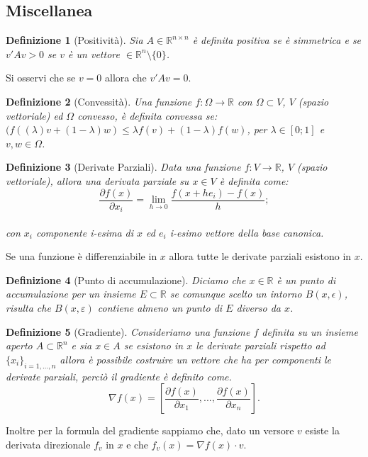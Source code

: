 \documentclass[a4paper, 12pt]{article}
\newtheorem{definition}{Definizione}
\begin{document}
\subsection{Miscellanea}
\begin{definition}[Positività]
Sia $A \in \mathbb{R}^{n \times n}$ è definita positiva se è simmetrica e se $v'Av > 0$ se $v$ è un vettore $\in \mathbb{R}^n \setminus \{0\}$.
\end{definition}
Si osservi che se $v = 0$ allora che $v'Av = 0$.
\begin{definition}[Convessità]
Una funzione $f:\Omega \to \mathbb{R}$ con $\Omega \subset V$, $V$ (spazio vettoriale) ed $\Omega$ convesso, è definita convessa se: $(f((\lambda)v + (1 - \lambda)w) \leq \lambda f(v) + (1 - \lambda)f(w)$, per $\lambda \in [0;1]$ e $v, w \in \Omega$.
\end{definition}
\begin{definition}[Derivate Parziali]
Data una funzione $f:V \to \mathbb{R}$, $V$ (spazio vettoriale), allora una derivata parziale su $x \in V$ è definita come:\\
\[\frac{\partial f(x)}{\partial x_i} = \lim_{h \to 0} \frac{f(x + h e_i) - f(x)}{h};\]\\ 
con $x_i$ componente i-esima di $x$ ed $e_i$ i-esimo vettore della base canonica.\\
\end{definition}
Se una funzione è differenziabile in $x$ allora tutte le derivate parziali esistono in $x$.
\begin{definition}[Punto di accumulazione]
Diciamo che $x \in \mathbb{R}$ è un punto di accumulazione per un insieme $E \subset \mathbb{R}$ se comunque scelto un intorno $B(x, \epsilon)$, risulta che $B(x, \varepsilon)$ contiene almeno un punto di $E$ diverso da $x$.
\end{definition}
\begin{definition}[Gradiente]
Consideriamo una funzione $f$ definita su un insieme aperto $A \subset \mathbb{R}^n$ e sia $x \in A$ se esistono in $x$ le derivate parziali rispetto ad $\{x_i\}_{i=1, ..., n}$ allora è possibile costruire un vettore che ha per componenti le derivate parziali, perciò il gradiente è definito come.\\
\[\nabla f(x) = \left[\frac{\partial f(x)}{\partial x_1}, ..., \frac{\partial f(x)}{\partial x_n}\right].\]
\end{definition}
Inoltre per la formula del gradiente sappiamo che, dato un versore $v$ esiste la derivata direzionale $f_v$ in $x$ e che $f_v(x) = \nabla f(x) \cdot v$.
\newpage



\end{document}

